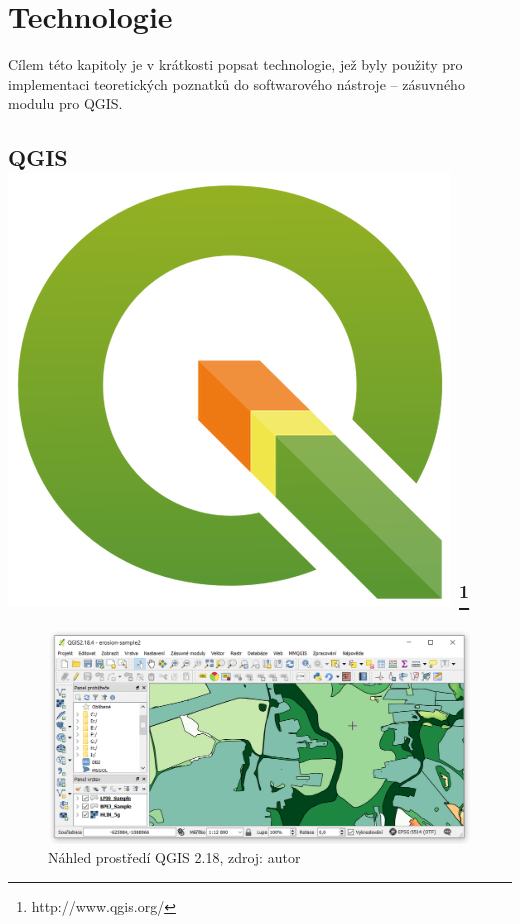 \chapter{Technologie}
\label{3-technologie}
Cílem této kapitoly je v krátkosti popsat technologie, jež byly
použity pro implementaci teoretických poznatků do softwarového
nástroje – zásuvného modulu pro QGIS.
\section[QGIS]{QGIS \includegraphics[scale=0.055]{./pictures/qgis.png} 
\footnote{http://www.qgis.org/}}
\label{qgis}
\begin{figure}[H]
    \centering \includegraphics[scale=0.6]{./pictures/qgis_screen.png}
      \caption[Náhled prostředí QGIS 2.18]
      {Náhled prostředí QGIS 2.18, zdroj: autor}
      \label{screen:qgis}
\end{figure}
